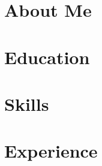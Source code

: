 \documentclass[10pt, a4paper]{article}
\begin{document}
    \newcommand{\AND}{\unskip
        \cleaders\copy\ANDbox\hskip\wd\ANDbox
        \ignorespaces
    }
    \newsavebox\ANDbox
    \sbox\ANDbox{$|$}
    
\vspace{7pt - 0.3cm}

\section{About Me}

\section{Education}

\section{Skills}

\section{Experience}
    
\end{document}
